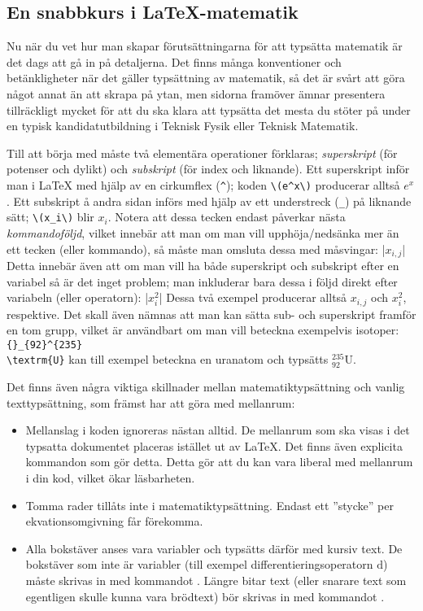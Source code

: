 \documentclass[lang=sv,ptsize=10pt,font=none,nomath,titles=bf,../../a4.tex]{subfiles}
\begin{document}
\subsection{En snabbkurs i \LaTeX-matematik}
Nu när du vet hur man skapar förutsättningarna för att typsätta matematik
är det dags att gå in på detaljerna. Det finns många konventioner
och betänkligheter när det gäller typsättning av matematik, så det är
svårt att göra något annat än att skrapa på ytan, men sidorna framöver
ämnar presentera tillräckligt mycket för att du ska klara att typsätta
det mesta du stöter på under en typisk kandidatutbildning i Teknisk Fysik
eller Teknisk Matematik.

\label{sec:3:subscript}
Till att börja med måste två elementära operationer förklaras;
\emph{superskript} (för potenser och dylikt) och \emph{subskript} (för 
index och liknande). Ett superskript inför man i \LaTeX{} med hjälp av
en cirkumflex (\verb|^|); koden \verb|\(e^x\)| producerar alltså \(e^x\).
Ett subskript å andra sidan införs med hjälp av ett understreck (\verb|_|)
på liknande sätt; \verb|\(x_i\)| blir \(x_i\). Notera att dessa tecken
endast påverkar nästa \emph{kommandoföljd}, vilket innebär att man om man
vill upphöja/nedsänka mer än ett tecken (eller kommando), så måste man
omsluta dessa med måsvingar:
\latex|\(x_{i,j}\)|
Detta innebär även att om man vill ha både superskript och subskript efter
en variabel så är det inget problem; man inkluderar bara dessa i följd
direkt efter variabeln (eller operatorn):
\latex|\(x_i^2\)|
Dessa två exempel producerar alltså \(x_{i,j}\) och \(x_i^2\), 
respektive. Det skall även nämnas att man kan sätta sub- och superskript
framför en tom grupp, vilket är användbart om man vill beteckna exempelvis
isotoper: \verb|{}_{92}^{235}|\\\verb|\textrm{U}| kan till exempel beteckna en uranatom
och typsätts \({}_{92}^{235}\textrm{U}\).

Det finns även några viktiga skillnader mellan matematiktypsättning och
vanlig texttypsättning, som främst har att göra med mellanrum:
\begin{itemize}
	\item Mellanslag i koden ignoreras nästan alltid. De mellanrum som ska
	visas i det typsatta dokumentet placeras istället ut av \LaTeX. Det
	finns även explicita kommandon som gör detta. Detta gör att du kan
	vara liberal med mellanrum i din kod, vilket ökar läsbarheten.
	
	\item Tomma rader tillåts inte i matematiktypsättning. Endast ett
	”stycke” per ekvationsomgivning får förekomma.
	
	\item Alla bokstäver anses vara variabler och typsätts därför med
	kursiv text. De bokstäver som inte är variabler (till exempel
	differentieringsoperatorn \(\mathrm{d}\)) måste skrivas in med 
	kommandot . Längre bitar text (eller snarare text
	som egentligen skulle kunna vara brödtext)
	bör skrivas in med kommandot .
\end{itemize}
\end{document}
